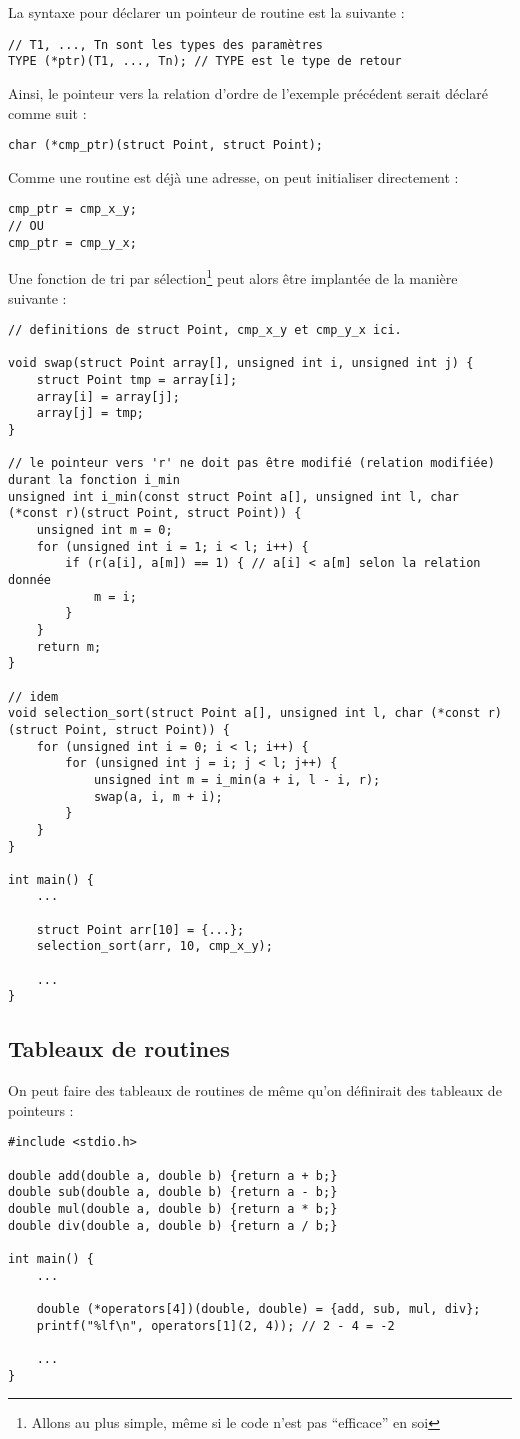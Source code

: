 \documentclass[../../../main.tex]{subfiles}
\begin{document}
La syntaxe pour déclarer un pointeur de routine est la suivante :
\begin{verbatim}
// T1, ..., Tn sont les types des paramètres
TYPE (*ptr)(T1, ..., Tn); // TYPE est le type de retour
\end{verbatim}
Ainsi, le pointeur vers la relation d'ordre de l'exemple précédent serait déclaré comme suit :
\begin{verbatim}
char (*cmp_ptr)(struct Point, struct Point);
\end{verbatim}
Comme une routine est déjà une adresse, on peut initialiser directement :
\begin{verbatim}
cmp_ptr = cmp_x_y;
// OU
cmp_ptr = cmp_y_x;
\end{verbatim}
Une fonction de tri par sélection\footnote{Allons au plus simple, même si le code n'est pas ``efficace'' en soi} peut alors être implantée de la manière suivante :
\begin{verbatim}
// definitions de struct Point, cmp_x_y et cmp_y_x ici.

void swap(struct Point array[], unsigned int i, unsigned int j) {
	struct Point tmp = array[i];
	array[i] = array[j];
	array[j] = tmp;
}

// le pointeur vers 'r' ne doit pas être modifié (relation modifiée) durant la fonction i_min
unsigned int i_min(const struct Point a[], unsigned int l, char (*const r)(struct Point, struct Point)) {
	unsigned int m = 0;
	for (unsigned int i = 1; i < l; i++) {
		if (r(a[i], a[m]) == 1) { // a[i] < a[m] selon la relation donnée
			m = i;
		}
	}
	return m;
}

// idem
void selection_sort(struct Point a[], unsigned int l, char (*const r)(struct Point, struct Point)) {
	for (unsigned int i = 0; i < l; i++) {
		for (unsigned int j = i; j < l; j++) {
			unsigned int m = i_min(a + i, l - i, r);
			swap(a, i, m + i);
		}
	}
}

int main() {
	...

	struct Point arr[10] = {...};
	selection_sort(arr, 10, cmp_x_y);

	...
}
\end{verbatim}
\subsection{Tableaux de routines}
\label{sub:tableaux_de_routines}
On peut faire des tableaux de routines de même qu'on définirait des tableaux de pointeurs :
\begin{verbatim}
#include <stdio.h>

double add(double a, double b) {return a + b;}
double sub(double a, double b) {return a - b;}
double mul(double a, double b) {return a * b;}
double div(double a, double b) {return a / b;}

int main() {
	...

	double (*operators[4])(double, double) = {add, sub, mul, div};
	printf("%lf\n", operators[1](2, 4)); // 2 - 4 = -2
	
	...
}
\end{verbatim}
\end{document}
